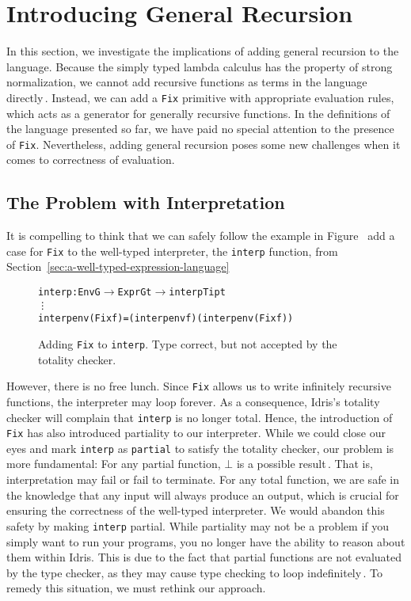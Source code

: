 \section{Introducing General Recursion}
\label{sec:partiality}

In this section, we investigate the implications of adding general recursion to the language. Because the simply typed lambda calculus has the property of strong normalization, we cannot add recursive functions as terms in the language directly\,\cite[p. 143]{Pierce:TypeSystems}. Instead, we can add a \texttt{Fix} primitive with appropriate evaluation rules, which acts as a generator for generally recursive functions. In the definitions of the language presented so far, we have paid no special attention to the presence of \texttt{Fix}. Nevertheless, adding general recursion poses some new challenges when it comes to correctness of evaluation.

\subsection{The Problem with Interpretation}
It is compelling to think that we can safely   follow the example in Figure~ add a case for \texttt{Fix} to the well-typed interpreter, the \texttt{interp} function, from Section~\ref{sec:a-well-typed-expression-language}

\begin{figure}
\begin{alltt}
  interp : Env G \(\rightarrow\) Expr G t \(\rightarrow\) interpTip t
  \vdots
  interp env (Fix f) = (interp env f) (interp env (Fix f))
\end{alltt}
\caption{Adding \texttt{Fix} to \texttt{interp}. Type correct, but not accepted by the totality checker.}
\label{fig:interp-fix}
\end{figure}

However, there is no free lunch. Since \texttt{Fix} allows us to write infinitely recursive functions, the interpreter may loop forever. As a consequence, Idris's totality checker will complain that \texttt{interp} is no longer total. Hence, the introduction of \texttt{Fix} has also introduced partiality to our interpreter. While we could close our eyes and mark \texttt{interp} as \texttt{partial} to satisfy the totality checker, our problem is more fundamental: For any partial function, $\bot$ is a possible result\,\cite{Turner04totalfunctional}. That is, interpretation may fail or fail to terminate. For any total function, we are safe in the knowledge that any input will always produce an output, which is crucial for ensuring the correctness of the well-typed interpreter. We would abandon this safety by making \texttt{interp} partial. While partiality may not be a problem if you simply want to run your programs, you no longer have the ability to reason about them within Idris. This is due to the fact that partial functions are not evaluated by the type checker, as they may cause type checking to loop indefinitely\,. To remedy this situation, we must rethink our approach.

